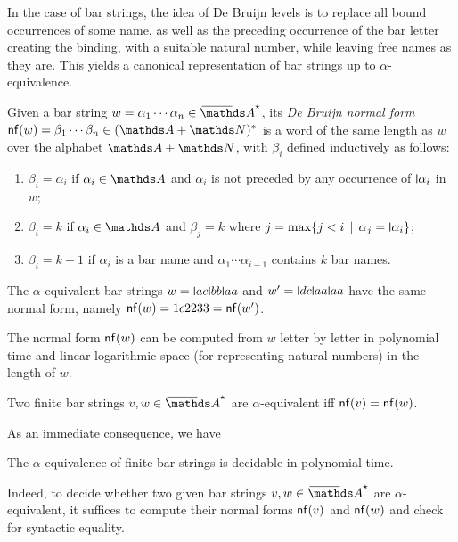 \documentclass[a4paper,UKenglish,cleveref,autoref,thm-restate,numberwithinsect,final]{lipics-v2021}
\begin{document}
     In the case of bar strings, the idea of De Bruijn levels is to replace all bound occurrences of some name, as well as the preceding occurrence of the bar letter creating the binding, with a suitable natural number, while leaving free names as they are. This yields a canonical representation of bar strings up to $\alpha$-equivalence.

    \begin{defn}
        Given a bar string $w = \alpha_1 \cdots \alpha_n \in \barAs$, its \emph{De Bruijn normal form} $\nf(w) = \beta_1 \cdots \beta_n \in (\names + \Nat)^\ast$ is a word of the same length as $w$ over the alphabet $\names + \Nat$, with $\beta_i$ defined inductively as follows:
        \begin{enumerate}
            \item $\beta_i = \alpha_i$ if $\alpha_i\in \names$ and $\alpha_i$ is not preceded by any occurrence of $\newletter{\alpha_i}$ in $w$;
            \item $\beta_i = k$ if $\alpha_i \in \names$ and $\beta_j = k$ where $j = \max\setw{j < i}{\alpha_j = \newletter{\alpha_i}}$;
            \item $\beta_i = k + 1$ if $\alpha_i$ is a bar name and $\alpha_1 \cdots \alpha_{i - 1}$ contains $k$ bar names.
        \end{enumerate}
    \end{defn}
    \begin{expl}
The $\alpha$-equivalent bar strings $w = \newletter{a}c\newletter{b}b\newletter{a}a$ and $w' = \newletter{d}c\newletter{a}a\newletter{a}a$ have the same normal form, namely $\mathsf{nf}(w) = 1c2233 = \mathsf{nf}(w')$.
    \end{expl}

    The normal form $\mathsf{nf}(w)$ can be computed from $w$ letter by letter in polynomial time and linear-logarithmic space
    (for representing natural numbers) in the length of $w$. 
    
    \begin{proposition}\label{lem:aeDBNF}
        Two finite bar strings $v, w \in \barAs$ are $\alpha$-equivalent iff $\mathsf{nf}(v) = \mathsf{nf}(w)$.
    \end{proposition}
As an immediate consequence, we have
\begin{corollary}\label{cor:alphaeq-decidable-finite-bar-strings}
The $\alpha$-equivalence of finite bar strings is decidable in polynomial time.
\end{corollary}
Indeed, to decide whether two given bar strings $v,w\in \barAs$ are $\alpha$-equivalent, it suffices to compute their normal forms $\mathsf{nf}(v)$ and $\mathsf{nf}(w)$ and check for syntactic equality.
      
\end{document}

